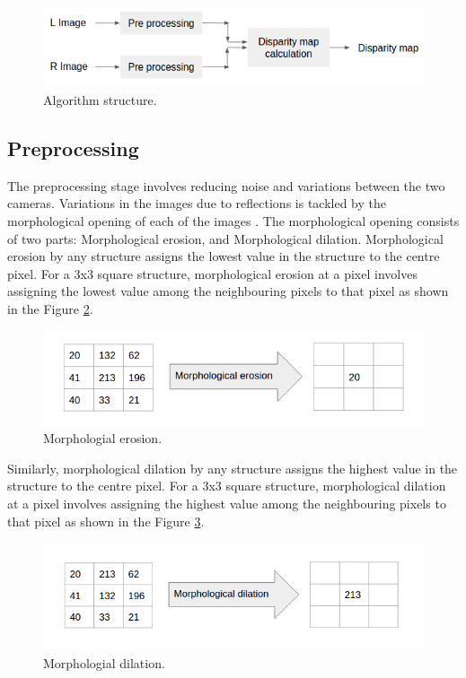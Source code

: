 \begin{figure}
    \center
    \includegraphics[width=.8\linewidth]{figures/algorithm_structure}
    \caption{Algorithm structure.}
    \label{fig:algorithmstructure}
\end{figure}
%

\subsection{Preprocessing}
\label{s:algorithm:preprocessing}

The preprocessing stage involves reducing noise and variations between the two cameras. Variations in the images due to reflections is tackled by the morphological opening of each of the images \cite{Rosli2014}. The morphological opening consists of two parts: Morphological erosion, and Morphological dilation. Morphological erosion by any structure assigns the lowest value in the structure to the centre pixel. For a 3x3 square structure, morphological erosion at a pixel involves assigning the lowest value among the neighbouring pixels to that pixel as shown in the Figure \ref{fig:morphologicalerosion}.

 \begin{figure}
    \center
    \includegraphics[width=120mm]{figures/Morphological_erosion}
    \caption{Morphologial erosion.}
    \label{fig:morphologicalerosion}
\end{figure}


Similarly, morphological dilation by any structure assigns the highest value in the structure to the centre pixel. For a 3x3 square structure, morphological dilation at a pixel involves assigning the highest value among the neighbouring pixels to that pixel as shown in the Figure \ref{fig:morphologicaldilation}.

 \begin{figure}
    \center
    \includegraphics[width=120mm]{figures/Morphological_dilation}
    \caption{Morphologial dilation.}
    \label{fig:morphologicaldilation}
\end{figure}

